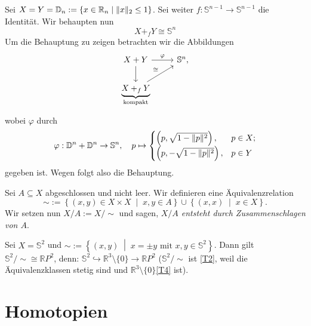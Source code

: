 \documentclass[
12pt, 
openany, 
a4paper, 
final,
fleqn, 
]{myclass}
\numberwithin{equation}{chapter}
\numberwithin{section}{chapter}
\newcommand{\RR}{\mathbb R}
\newcommand{\Ss}{\mathbb S}
\newcommand{\DD}{\mathbb D}
\newcommand{\set}[2]{\left\{#1\;\middle|\;#2\right\}}
\DeclarePairedDelimiter{\norm}{\lVert}{\rVert}
\newcommand{\todo}[1]{}
\begin{document}
\begin{eg}\label{4.20}
Sei $ X=Y= \DD_{n}:=\set{x\in \mathbb{R}_{n}}{\norm{x}_{2}\leq 1} $. Sei weiter $ f:\mathbb{S}^{n-1}\to\mathbb{S}^{n-1} $ die Identität. Wir behaupten nun 
\begin{equation}\label{XpfYhomoeoSn}
X+_{f} Y \cong \Ss^n
\end{equation}
Um die Behauptung zu zeigen betrachten wir die Abbildungen
\[ 
\begin{tikzcd}
X + Y \arrow{r}{\varphi} \arrow{d}{} & \mathbb{S}^{n}, \\
\underbrace{X +_{f} Y}_{\text{kompakt}} \arrow{ru}{\cong}
\end{tikzcd}
\]
wobei $ \varphi $ durch 
\[
\varphi: \mathbb{D}^{n} + \mathbb{D}^{n} \to \mathbb{S}^{n}, \quad p \mapsto \begin{cases}
\left(p, \sqrt{1- \norm p^{2}}\right), &p\in X; \\
\left(p, - \sqrt{1- \norm p^{2}}\right), & p\in Y
\end{cases}
\]
gegeben ist. Wegen  folgt also die Behauptung. 
\end{eg}

\begin{defn}\label{4.21}
Sei $ A\subseteq X $ abgeschlossen und nicht leer. Wir definieren eine Äquivalenzrelation
\[ 
\sim := \set{(x, y)\in X\times X}{x, y\in A} \cup \set{(x,x)}{x\in X}.
\]
Wir setzen nun $ X/A := X/\sim $ und sagen, \emph{$ X/A $ entsteht durch Zusammenschlagen von $ A $}. 
\end{defn}

\todo{Beispiel 4.22}

\begin{eg}\label{4.23}
Sei $ X=\mathbb{S}^{2} $ und $\sim := \set{(x, y)}{x=\pm y \text{ mit } x, y\in \mathbb{S}^{2}}$. Dann gilt $ \mathbb{S}^{2}/\sim \cong \mathbb{R}P^{2} $, denn: $ \mathbb{S}^{2} \hookrightarrow \mathbb{R}^{3}\setminus \{0\} \to \mathbb{R} P^{2}$ ($ \mathbb{S}^{2}/\sim $ ist \ref{T2}, weil die Äquivalenzklassen stetig sind und $ \RR^{3}\setminus\{0\} $\ref{T4} ist). \todo{Überarbeiten}
\end{eg}
\todo{Restliche Beispiele in diesem Kapitel}
\section{Homotopien}
\end{document}
